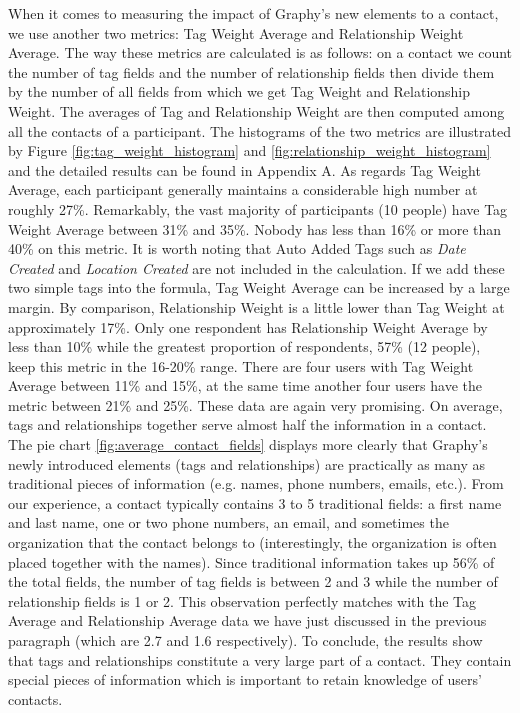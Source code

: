 When it comes to measuring the impact of Graphy's new elements to a contact, we use another two metrics: Tag Weight Average and Relationship Weight Average. The way these metrics are calculated is as follows: on a contact we count the number of tag fields and the number of relationship fields then divide them by the number of all fields from which we get Tag Weight and Relationship Weight. The averages of Tag and Relationship Weight are then computed among all the contacts of a participant. The histograms of the two metrics are illustrated by Figure \ref{fig:tag_weight_histogram} and \ref{fig:relationship_weight_histogram} and the detailed results can be found in Appendix A. As regards Tag Weight Average, each participant generally maintains a considerable high number at roughly 27\%. Remarkably, the vast majority of participants (10 people) have Tag Weight Average between 31\% and 35\%. Nobody has less than 16\% or more than 40\% on this metric. It is worth noting that Auto Added Tags such as \textit{Date Created} and \textit{Location Created} are not included in the calculation. If we add these two simple tags into the formula, Tag Weight Average can be increased by a large margin. By comparison, Relationship Weight is a little lower than Tag Weight at approximately 17\%. Only one respondent has Relationship Weight Average by less than 10\% while the greatest proportion of respondents, 57\% (12 people), keep this metric in the 16-20\% range. There are four users with Tag Weight Average between 11\% and 15\%, at the same time another four users have the metric between 21\% and 25\%. These data are again very promising. On average, tags and relationships together serve almost half the information in a contact. The pie chart \ref{fig:average_contact_fields} displays more clearly that Graphy's newly introduced elements (tags and relationships) are practically as many as traditional pieces of information (e.g. names, phone numbers, emails, etc.). From our experience, a contact typically contains 3 to 5 traditional fields: a first name and last name, one or two phone numbers, an email, and sometimes the organization that the contact belongs to (interestingly, the organization is often placed together with the names). Since traditional information takes up 56\% of the total fields, the number of tag fields is between 2 and 3 while the number of relationship fields is 1 or 2. This observation perfectly matches with the Tag Average and Relationship Average data we have just discussed in the previous paragraph (which are 2.7 and 1.6 respectively). To conclude, the results show that tags and relationships constitute a very large part of a contact. They contain special pieces of information which is important to retain knowledge of users' contacts.

